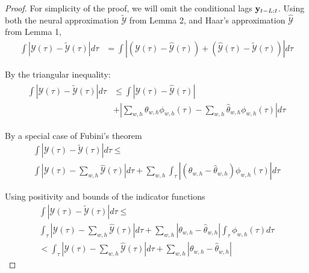 
\begin{proof} For simplicity of the proof, we will omit the conditional lags $\mathbf{y}_{t-L:t}$. Using both the neural approximation $\tilde{\mathcal{Y}}$ from Lemma 2, and Haar's approximation $\hat{\mathcal{Y}}$ from Lemma 1, 
\begin{align*}
    \int |\mathcal{Y}(\tau) -\tilde{\mathcal{Y}}(\tau)| d\tau 
    &= 
    \int |(\mathcal{Y}(\tau) - \hat{\mathcal{Y}}(\tau))+(\hat{\mathcal{Y}}(\tau)-\tilde{\mathcal{Y}}(\tau))| d\tau 
\end{align*}

By the triangular inequality:
\begin{align*}
\begin{split}
    \int |\mathcal{Y}(\tau) -\tilde{\mathcal{Y}}(\tau)| d\tau & \leq \int |\mathcal{Y}(\tau) - \hat{\mathcal{Y}}(\tau)| \\
    & +
    |\sum_{w,h} \theta_{w,h} \phi_{w,h}(\tau) - \sum_{w,h} \hat{\theta}_{w,h} \phi_{w,h}(\tau)| d \tau %
\end{split}
\end{align*}

By a special case of Fubini's theorem
\begin{align*}
    \int |\mathcal{Y}(\tau) -\tilde{\mathcal{Y}}(\tau)| d\tau \leq 
    \qquad\qquad\qquad\qquad\qquad\qquad\qquad\quad \\
    \int 
    |\mathcal{Y}(\tau) - \sum_{w,h} \hat{\mathcal{Y}}(\tau)| d \tau 
    +
    \sum_{w,h} \int_{\tau} 
    |(\theta_{w,h} - \hat{\theta}_{w,h}) \phi_{w,h}(\tau)| d \tau %
\end{align*}    

Using positivity and bounds of the indicator functions
\begin{align*}
    \int |\mathcal{Y}(\tau) -\tilde{\mathcal{Y}}(\tau)| d\tau 
    \leq \qquad\qquad\qquad\qquad\qquad\qquad\qquad\quad\\
    \int_{\tau} 
    |\mathcal{Y}(\tau) - \sum_{w,h} \hat{\mathcal{Y}}(\tau)| d \tau 
    +
    \sum_{w,h} |\theta_{w,h} - \hat{\theta}_{w,h}| \int_{\tau} \phi_{w,h}(\tau) d \tau \\
    < \int_{\tau} 
    |\mathcal{Y}(\tau) - \sum_{w,h} \hat{\mathcal{Y}}(\tau)| d \tau
    +
    \sum_{w,h} |\theta_{w,h} - \hat{\theta}_{w,h}| 
\end{align*} 


\end{proof}
